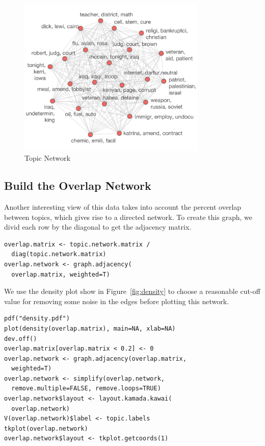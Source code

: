 \documentclass[%
	final,
	notitlepage,
	narroweqnarray,
	inline,
	]{ieee}
\begin{document}
\begin{figure}
\centering
\includegraphics[width=90mm]{topic-network.pdf}
\caption{Topic Network}
\label{fig:topic-network}
\end{figure}



\subsection{Build the Overlap Network}

\PARstart Another interesting view of this data takes into account the 
percent overlap between topics, which gives rise to a directed network.
To create this graph, we divid each row by the diagonal to get the
adjacency matrix.

\begin{verbatim}
overlap.matrix <- topic.network.matrix / 
  diag(topic.network.matrix)
overlap.network <- graph.adjacency(
  overlap.matrix, weighted=T)
\end{verbatim}

We use the density plot show in Figure~\ref{fig:density} to choose
a reasonable cut-off value for removing some noise in the edges before plotting this
network.  

\begin{verbatim}
pdf("density.pdf")
plot(density(overlap.matrix), main=NA, xlab=NA)
dev.off()
overlap.matrix[overlap.matrix < 0.2] <- 0
overlap.network <- graph.adjacency(overlap.matrix, 
  weighted=T)
overlap.network <- simplify(overlap.network, 
  remove.multiple=FALSE, remove.loops=TRUE)
overlap.network$layout <- layout.kamada.kawai(
  overlap.network)
V(overlap.network)$label <- topic.labels
tkplot(overlap.network)
overlap.network$layout <- tkplot.getcoords(1)
\end{verbatim}
\end{document}
